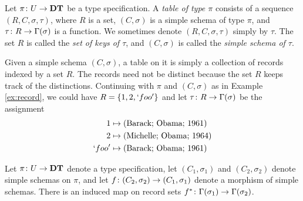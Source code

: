 \documentclass{amsart}
\begin{document}
\begin{definition}\label{def:tables}

Let $\pi\colon U\rightarrow{\bf DT}$ be a type specification.  A {\em table of type $\pi$} consists of a sequence $(R,C,\sigma,\tau)$, where $R$ is a set, $(C,\sigma)$ is a simple schema of type $\pi$,  and $\tau\colon R\rightarrow\Gamma(\sigma)$ is a function.  We sometimes denote $(R,C,\sigma,\tau)$ simply by $\tau$.  The set $R$ is called the {\em set of keys of $\tau$}, and $(C,\sigma)$ is called the {\em simple schema of $\tau$}.

\end{definition}

\begin{example}\label{ex:table}

Given a simple schema $(C,\sigma)$, a table on it is simply a collection of records indexed by a set $R$.  The records need not be distinct because the set $R$ keeps track of the distinctions.  Continuing with $\pi$ and $(C,\sigma)$ as in Example \ref{ex:record}, we could have $R=\{1,2,`foo'\}$ and let $\tau\colon R\rightarrow\Gamma(\sigma)$ be the assignment \begin{align*} 1&\mapsto \textnormal{(Barack; Obama; 1961)}\\2&\mapsto \textnormal{(Michelle; Obama; 1964)}\\ `foo'&\mapsto\textnormal{(Barack; Obama; 1961)}\end{align*}

\end{example}

\begin{lemma}\label{induced morphisms}

Let $\pi\colon U\rightarrow{\bf DT}$ denote a type specification, let $(C_1,\sigma_1)$ and $(C_2,\sigma_2)$ denote simple schemas on $\pi$, and let $f\colon (C_2,\sigma_2)\rightarrow (C_1,\sigma_1)$ denote a morphism of simple schemas.  There is an induced map on record sets $f^*\colon \Gamma(\sigma_1)\rightarrow\Gamma(\sigma_2)$.

\end{lemma}
\end{document}
